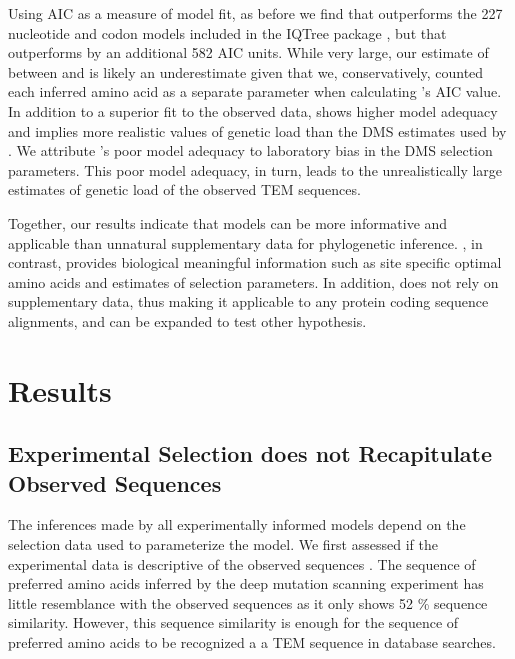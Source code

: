 \documentclass[fleqn,letterpaper]{article}
\begin{document}
Using AIC as a measure of model fit, as before we find that \phydms outperforms the 227 nucleotide and codon models included in the IQTree package \citep{bloom2014, bloom2017}, but that \selac outperforms \phydms by an additional 582 AIC units.
While very large, our estimate of \DeltaAIC between \selac and \phydms is likely an underestimate given that we, conservatively, counted each inferred amino acid as a separate parameter when calculating \selac's AIC value.
In addition to a superior fit to the observed data, \selac shows higher model adequacy and implies more realistic values of genetic load than the DMS estimates used by \phydms.
We attribute \phydms's poor model adequacy to laboratory bias in the DMS selection parameters.
This poor model adequacy, in turn, leads to the unrealistically large estimates of genetic load of the observed TEM sequences.

Together, our results indicate that models can be more informative and applicable than unnatural supplementary data for phylogenetic inference.
\selac, in contrast, provides biological meaningful information such as site specific optimal amino acids and estimates of selection parameters.
In addition, \selac does not rely on supplementary data, thus making it applicable to any protein coding sequence alignments, and can be expanded to test other hypothesis.

\section{Results}
\subsection{Experimental Selection does not Recapitulate Observed Sequences}
The inferences made by all experimentally informed models depend on the selection data used to parameterize the model.
We first assessed if the experimental data is descriptive of the observed sequences \citet{bloom2017}.
The sequence of preferred amino acids inferred by the deep mutation scanning experiment has little resemblance with the observed sequences as it only shows 52 \% sequence similarity.
However, this sequence similarity is enough for the sequence of preferred amino acids to be recognized a a TEM sequence in database searches.
\end{document}
